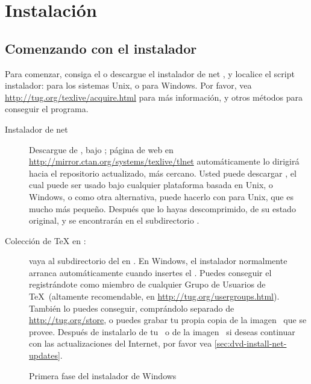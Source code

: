 \documentclass{article}
\begin{document}
\section{Instalación}
\label{sec:install}

\subsection{Comenzando con el instalador}
\label{sec:inst-start}

Para comenzar, consiga el \TK{} \DVD{} o descargue el instalador de
net \TL{}, y localice el script instalador:  para
los sistemas Unix, o  para Windows. Por
favor, vea
\url{http://tug.org/texlive/acquire.html} para más información, y
otros métodos para conseguir el programa.

\begin{description}
	\item [Instalador de net] Descargue de \CTAN{}, bajo
		; página de web en
		\url{http://mirror.ctan.org/systems/texlive/tlnet}
		automáticamente lo dirigirá hacia el repositorio
		actualizado, más cercano. Usted puede  descargar
		, el cual puede ser usado
		bajo cualquier plataforma basada en Unix, o Windows, o
		como otra alternativa, puede hacerlo con
		 para Unix, que es mucho
		más pequeño. Después que lo hayas descomprimido, de
		su estado original,  y
		 se encontrarán en el
		subdirectorio .

\item [Colección de \TeX{} en \DVD:] vaya al subdirectorio del \DVD en
	. En Windows, el instalador normalmente
	arranca automáticamente cuando insertes el \DVD. Puedes
	conseguir el \DVD\, registrándote como miembro de cualquier
	Grupo de Usuarios de \TeX\ (altamente recomendable, en
	\url{http://tug.org/usergroups.html}). También lo puedes
	conseguir, comprándolo separado de \url{http://tug.org/store},
	o puedes grabar tu propia copia de la imagen \ISO\ que se
	provee. Después de instalarlo de tu \DVD\, o de la imagen
	\ISO\, si deseas continuar con las actualizaciones del
	Internet, por favor vea \ref{sec:dvd-install-net-updates}.

\end{description}

\begin{figure}[tb]
\caption{Primera fase del instalador de Windows  }\label{fig:nsis}
\end{figure}
\end{document}
